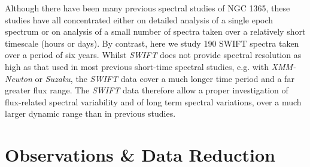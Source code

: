 \documentclass[useAMS,usenatbib]{sam}
\begin{document}

Although there have been many previous spectral studies of NGC 1365, these studies have all concentrated either on detailed analysis of a single epoch spectrum or on
analysis of a small number of spectra taken over a relatively short timescale (hours or days). By contrast, here we study 190 SWIFT spectra taken over a period of six
years. Whilst {\it SWIFT} does not provide spectral resolution as high as that used in most previous short-time spectral studies, e.g. with {\it XMM-Newton} or {\it
Suzaku}, the {\it SWIFT} data cover a much longer time period and a far greater flux range. The {\it SWIFT} data therefore allow a proper investigation of flux-related
spectral variability and of long term spectral variations, over a much larger dynamic range than in previous studies.

\section{Observations \& Data Reduction}
\end{document}
